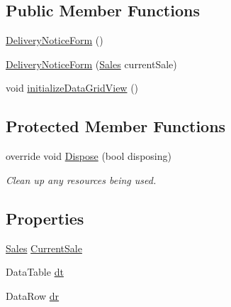 \subsection*{Public Member Functions}
\begin{DoxyCompactItemize}
\item 
\hyperlink{class_health___assignment_1_1_delivery_notice_form_a425d884b0729d701e19a3a6534a06dde}{Delivery\+Notice\+Form} ()
\item 
\hyperlink{class_health___assignment_1_1_delivery_notice_form_a55c9cbf97b675de5503f3be58160ab28}{Delivery\+Notice\+Form} (\hyperlink{class_health___assignment_1_1_sales}{Sales} current\+Sale)
\item 
void \hyperlink{class_health___assignment_1_1_delivery_notice_form_a1592aeb4881d0c35a9efe9b21fcde2a6}{initialize\+Data\+Grid\+View} ()
\end{DoxyCompactItemize}
\subsection*{Protected Member Functions}
\begin{DoxyCompactItemize}
\item 
override void \hyperlink{class_health___assignment_1_1_delivery_notice_form_a02016913942bd7928b0b560fffbe3f82}{Dispose} (bool disposing)
\begin{DoxyCompactList}\small\item\em Clean up any resources being used. \end{DoxyCompactList}\end{DoxyCompactItemize}
\subsection*{Properties}
\begin{DoxyCompactItemize}
\item 
\hyperlink{class_health___assignment_1_1_sales}{Sales} \hyperlink{class_health___assignment_1_1_delivery_notice_form_a36f05d9608dc91071bb62736c51f231a}{Current\+Sale}
\item 
Data\+Table \hyperlink{class_health___assignment_1_1_delivery_notice_form_ad82a6d93eaec7c686152a10d8798074e}{dt}
\item 
Data\+Row \hyperlink{class_health___assignment_1_1_delivery_notice_form_ab796649f845faa1a3719047b65977050}{dr}
\end{DoxyCompactItemize}


